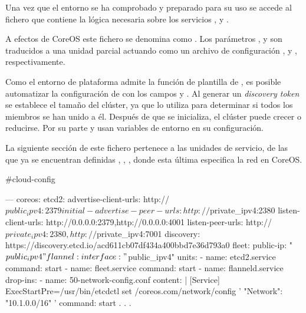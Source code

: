 Una vez que el entorno se ha comprobado y preparado para su uso se accede al fichero  que contiene la lógica necesaria sobre los servicios ,  y .

A efectos de CoreOS este fichero se denomina como . Los parámetros ,  y  son traducidos a una unidad  parcial actuando como un archivo de configuración ,  y , respectivamente. 

Como el entorno de plataforma admite la función de plantilla de , es posible automatizar la configuración de  con los campos  y . Al generar un \textit{discovery token} se establece el tamaño del clúster, ya que  lo utiliza para determinar si todos los miembros se han unido a él. Después de que se inicializa, el clúster puede crecer o reducirse. Por su parte  y  usan variables de entorno en su configuración.

La siguiente sección de este fichero pertenece a las unidades de servicio, de las que ya se encuentran definidas , , , donde esta última especifica la red en CoreOS.

\begin{codelisting}
\label{code:cloud-config1}
\begin{code}
#cloud-config

---
coreos:
  etcd2:
    advertise-client-urls: http://$public_ipv4:2379
    initial-advertise-peer-urls: http://$private_ipv4:2380
    listen-client-urls: http://0.0.0.0:2379,http://0.0.0.0:4001
    listen-peer-urls: http://$private_ipv4:2380,http://$private_ipv4:7001
    discovery: https://discovery.etcd.io/acd611cb07df434a400bbd7e36d793a0
  fleet:
    public-ip: "$public_ipv4"
  flannel:
    interface: "$public_ipv4"
  units:
  - name: etcd2.service
    command: start
  - name: fleet.service
    command: start
  - name: flanneld.service
    drop-ins:
    - name: 50-network-config.conf
      content: |
        [Service]
        ExecStartPre=/usr/bin/etcdctl set /coreos.com/network/config '{ "Network": "10.1.0.0/16" }'
    command: start
.
.
.
\end{code}
\end{codelisting}

